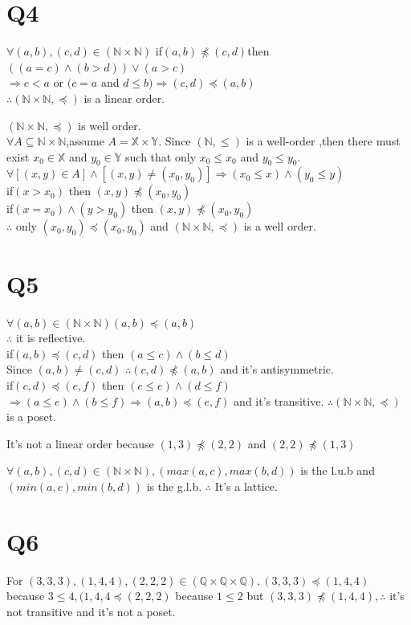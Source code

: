 \documentclass[12pt]{article}
\begin{document}
\section{Q4}
$\forall (a,b),(c,d)\in(\mathbb{N}\times\mathbb{N})$
if$(a,b)\npreceq(c,d)$then$((a=c)\wedge (b>d))\vee (a>c)$
\\ $\Rightarrow c<a$ or $(c=a$ and $d\leq b)\Rightarrow(c,d)\preceq(a,b)$
\\ $\therefore (\mathbb{N}\times\mathbb{N},\preceq)$ is a linear order.
\par $(\mathbb{N}\times\mathbb{N},\preceq)$ is well order.
\\$\forall A\subseteq\mathbb{N}\times\mathbb{N}$,assume $A=\mathbb{X}\times\mathbb{Y}$. Since $(\mathbb{N},\leq)$ is a well-order ,then there must exist $x_0\in\mathbb{X}$ and $y_0\in\mathbb{Y}$ such that only $x_0\leq x_0$ and $y_0\leq y_0$. 
\\$\forall[(x,y)\in A]\wedge [(x,y)\neq(x_0,y_0)]\Rightarrow(x_0\leq x)\wedge (y_0\leq y)$ 
\\if$(x>x_0)$ then $(x,y)\npreceq(x_0,y_0)$
\\if$(x=x_0)\wedge(y>y_0)$ then $(x,y)\npreceq(x_0,y_0)$
\\$\therefore$ only $(x_0,y_0)\preceq(x_0,y_0)$ and $(\mathbb{N}\times\mathbb{N},\preceq)$ is a well order.
\section{Q5}
$\forall (a,b)\in(\mathbb{N}\times\mathbb{N}) (a,b)\preceq(a,b)$
\\$\therefore$ it is reflective.
\\if$(a,b)\preceq (c,d)$ then $(a\leq c)\wedge (b\leq d)$
\\Since $(a,b)\neq(c,d)$ $\therefore(c,d)\npreceq(a,b)$ and it's antisymmetric.
\\if$(c,d)\preceq (e,f)$ then $(c\leq e)\wedge (d\leq f)$
\\$\Rightarrow(a\leq e)\wedge (b\leq f)\Rightarrow(a,b)\preceq(e,f)$ and it's transitive.
$\therefore(\mathbb{N}\times\mathbb{N},\preceq)$ is a poset. 
\par It's not a linear order because $(1,3)\npreceq(2,2)$ and $(2,2)\npreceq(1,3)$
\par $\forall (a,b),(c,d)\in(\mathbb{N}\times\mathbb{N}),(max(a,c),max(b,d))$ is the l.u.b and $(min(a,c),min(b,d))$ is the g.l.b.
$\therefore$ It's a lattice.
\section{Q6}
For $(3,3,3),(1,4,4),(2,2,2)\in(\mathbb{Q}\times\mathbb{Q}\times\mathbb{Q}),(3,3,3)\preceq(1,4,4)$ because $3\leq 4,(1,4,4\preceq(2,2,2)$ because $1\leq 2$ but $(3,3,3)\npreceq(1,4,4), \therefore$ it's not transitive and it's not a poset.
\end{document}

